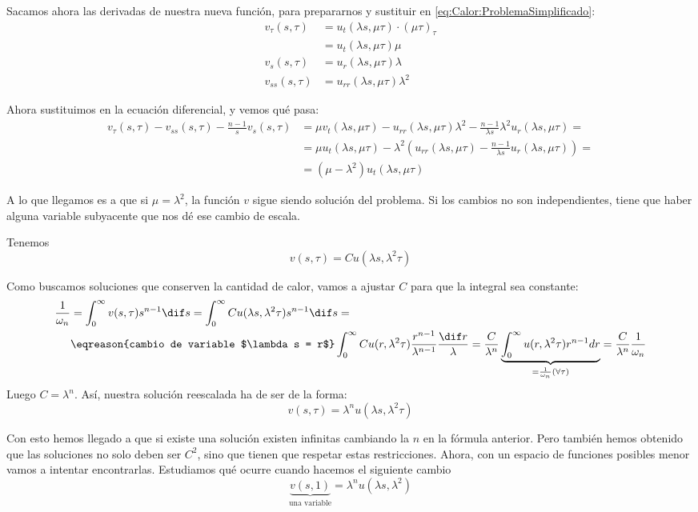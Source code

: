 		Sacamos ahora las derivadas de nuestra nueva función, para prepararnos y sustituir en \eqref{eq:Calor:ProblemaSimplificado}:
		\begin{align*}
			v_\tau (s,\tau) &= u_t (\lambda s, \mu \tau) \cdot (\mu \tau)_{\tau} \\
				&= u_t(\lambda s, \mu \tau) \mu \\
				v_s(s,\tau) &= u_r(\lambda s, \mu \tau) \lambda \\
				v_{ss}(s,\tau) &= u_{rr} (\lambda s, \mu \tau) \lambda^2
		\end{align*}

		Ahora sustituimos en la ecuación diferencial, y vemos qué pasa:
		\begin{align*}
		v_\tau (s,\tau) - v_{ss}(s,\tau) - \frac{n-1}{s} v_s(s,\tau)
			&= \mu v_t(\lambda s, \mu \tau) - u_{rr}(\lambda s, \mu \tau) \lambda^2 - \frac{n-1}{\lambda s} \lambda^2 u_r(\lambda s, \mu \tau) = \\
			&= \mu u_t(\lambda s, \mu \tau) - \lambda^2 \left( u_{rr}(\lambda s, \mu \tau) - \frac{n-1}{\lambda s} u_r(\lambda s, \mu \tau)\right) = \\
			&= (\mu - \lambda^2) u_t(\lambda s, \mu \tau)
		\end{align*}

		A lo que llegamos es a que si $μ = λ^2$, la función $v$ sigue siendo solución del problema. Si los cambios no son independientes, tiene que haber alguna variable subyacente que nos dé ese cambio de escala.

		Tenemos
		\[ v(s, \tau) = C u(\lambda s, \lambda^2 \tau) \]

		Como buscamos soluciones que conserven la cantidad de calor, vamos a ajustar $C$ para que la integral sea constante:
		\begin{align*}
		\frac{1}{\omega_{n}} &= \int_0^\infty v(s, \tau) s^{n-1} \dif s
		= \int_0^\infty C u(\lambda s, \lambda^2 \tau) s^{n-1} \dif s = \\
		&\eqreason{cambio de variable $\lambda s = r$} \int_0^\infty C u(r, \lambda^2 \tau) \frac{r^{n-1}}{\lambda^{n-1}} \frac{\dif r}{\lambda}
		= \frac{C}{\lambda^n}  \underbrace{\int_0^\infty   u(r, \lambda^2\tau) r^{n-1} dr}_{= \frac{1}{\omega_n} (\forall \tau)}
		= \frac{C}{\lambda^n}\frac{1}{\omega_n}
		\end{align*}
		Luego $C = \lambda^n$. Así, nuestra solución reescalada ha de ser de la forma:
		\[ v(s,\tau) = \lambda^n u(\lambda s, \lambda^2 \tau)\]

		Con esto hemos llegado a que si existe una solución existen infinitas cambiando la $n$ en la fórmula anterior. Pero también hemos obtenido que las soluciones no solo deben ser $C^2$, sino que tienen que respetar estas restricciones. Ahora, con un espacio de funciones posibles menor vamos a intentar encontrarlas. Estudiamos qué ocurre cuando hacemos el siguiente cambio
		\[ \underbrace{v(s,1)}_{\text{una variable}} = \lambda^n u (\lambda s, \lambda^2) \]

